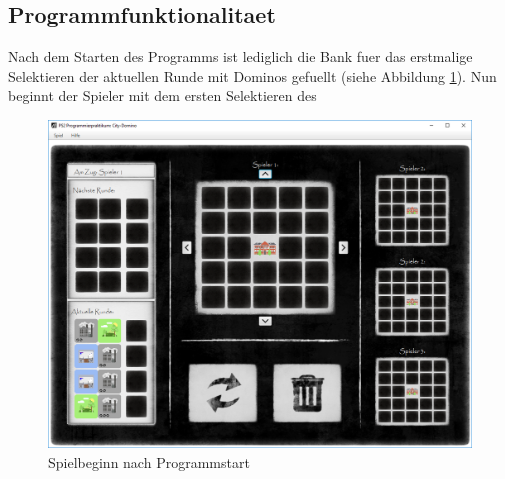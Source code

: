 \subsection{Programmfunktionalitaet}
Nach dem Starten des Programms ist lediglich die Bank fuer das erstmalige Selektieren der aktuellen Runde mit Dominos gefuellt (siehe Abbildung \ref{fig:spielbeginnGui}). Nun beginnt der Spieler mit dem ersten Selektieren des 
\begin{figure}
	\centering
	\includegraphics{screenshots/screenshot_Spielbeginn.png}
	\caption[Spielbeginn]{Spielbeginn nach Programmstart}
	\label{fig:spielbeginnGui}
\end{figure}


\label{par:anlegeregeln}
